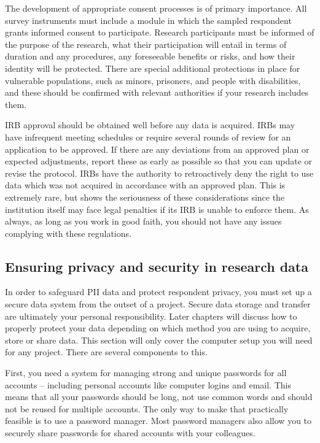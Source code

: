 The development of appropriate consent processes is of primary importance.
All survey instruments must include a module in which the sampled respondent grants informed consent to participate.
Research participants must be informed of the purpose of the research,
what their participation will entail in terms of duration and any procedures,
any foreseeable benefits or risks,
and how their identity will be protected.
There are special additional protections in place for vulnerable populations,
such as minors, prisoners, and people with disabilities,
and these should be confirmed with relevant authorities if your research includes them.

IRB approval should be obtained well before any data is acquired.
IRBs may have infrequent meeting schedules
or require several rounds of review for an application to be approved.
If there are any deviations from an approved plan or expected adjustments,
report these as early as possible so that you can update or revise the protocol.
IRBs have the authority to retroactively deny
the right to use data which was not acquired in accordance with an approved plan.
This is extremely rare, but shows the seriousness of these considerations
since the institution itself may face legal penalties if its IRB
is unable to enforce them. As always, as long as you work in good faith,
you should not have any issues complying with these regulations.

\subsection{Ensuring privacy and security in research data}

In order to safeguard PII data and protect respondent privacy,
you must set up a secure data system from the outset of a project.
Secure data storage and transfer are ultimately your personal responsibility.
Later chapters will discuss how to properly protect your data depending on
which method you are using to acquire, store or share data.
This section will only cover the computer setup you will need for any project.
There are several components to this.

First, you need a system for managing strong and unique passwords for
all accounts -- including personal accounts like computer logins and email.
This means that all your passwords should be long,
not use common words and should not be reused for multiple accounts.
The only way to make that practically feasible is to use a password manager.
Most password managers also allow you to securely share passwords
for shared accounts with your colleagues.

